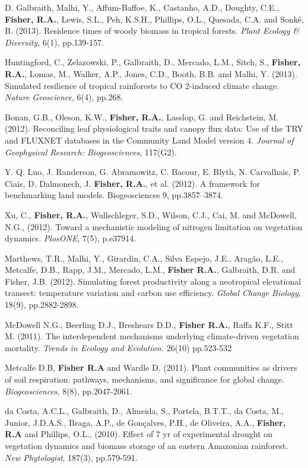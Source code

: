 \documentclass[10pt]{article}
\newenvironment{lonelist}[1][\enskip\textbullet]%
        {\vspace{-\baselineskip}\begin{list}{#1}{%
        \setlength{\itemindent}{-3pt} 
        \setlength{\partopsep}{0pt}%
        \setlength{\leftmargin}{10pt}
        \setlength{\topsep}{15pt}}}
        {\end{list}\vspace{-.3\baselineskip}}
\begin{document}
\begin{lonelist}
{\item[22] {D. Galbraith, Malhi, Y., Affum-Baffoe, K., Castanho, A.D., Doughty, C.E., \textbf{Fisher, R.A.}, Lewis, S.L., Peh, K.S.H., Phillips, O.L., Quesada, C.A. and Sonk\'{e}, B. (2013). Residence times of woody biomass in tropical forests. \emph{Plant Ecology \& Diversity}, 6(1), pp.139-157.
}
\item[21] {Huntingford, C., Zelazowski, P., Galbraith, D., Mercado, L.M., Sitch, S., \textbf{Fisher, R.A.}, Lomas, M., Walker, A.P., Jones, C.D., Booth, B.B. and Malhi, Y. (2013). Simulated resilience of tropical rainforests to CO 2-induced climate change. \emph{Nature Geoscience}, 6(4), pp.268.
\item[20] {Bonan, G.B., Oleson, K.W., \textbf{Fisher, R.A.}, Lasslop, G. and Reichstein, M. (2012). Reconciling leaf physiological traits and canopy flux data: Use of the TRY and FLUXNET databases in the Community Land Model version 4. \emph{Journal of Geophysical Research: Biogeosciences}, 117(G2).}
\item[19] { Y. Q. Luo, J. Randerson, G. Abramowitz, C. Bacour, E. Blyth, N. Carvalhais, P. Ciais, D. Dalmonech, J. \textbf{Fisher, R.A.}, et al. (2012). A framework for benchmarking land models. Biogeosciences 9, pp.3857–3874.}
\item[18] {Xu, C., \textbf{Fisher, R.A.}, Wullschleger, S.D., Wilson, C.J., Cai, M. and McDowell, N.G., (2012). Toward a mechanistic modeling of nitrogen limitation on vegetation dynamics. \emph{PlosONE}, 7(5), p.e37914.}
\item[17] {Marthews, T.R., Malhi, Y., Girardin, C.A., Silva Espejo, J.E., Aragão, L.E., Metcalfe, D.B., Rapp, J.M., Mercado, L.M., \textbf{Fisher R.A.}, Galbraith, D.R. and Fisher, J.B. (2012). Simulating forest productivity along a neotropical elevational transect: temperature variation and carbon use efficiency. \emph{Global Change Biology}, 18(9), pp.2882-2898.} 
\item[16]  McDowell N.G., Beerling D.J., Breshears D.D., \textbf{Fisher R.A.}, Raffa K.F., Stitt M. (2011). The interdependent mechanisms underlying climate-driven vegetation mortality. \emph{Trends in Ecology and Evolution.} 26(10) pp.523-532
\item[15]  Metcalfe D.B, \textbf{Fisher R.A} and Wardle D. (2011). Plant communities as drivers of soil respiration: pathways, mechanisms, and significance for global change. \emph{Biogeosciences}, 8(8), pp.2047-2061.
\item[14] {da Costa, A.C.L., Galbraith, D., Almeida, S., Portela, B.T.T., da Costa, M., Junior, J.D.A.S., Braga, A.P., de Gonçalves, P.H., de Oliveira, A.A., \textbf{Fisher, R.A} and Phillips, O.L., (2010). Effect of 7 yr of experimental drought on vegetation dynamics and biomass storage of an eastern Amazonian rainforest. \emph{New Phytologist}, 187(3), pp.579-591.}
}}
\end{lonelist}
\end{document}
